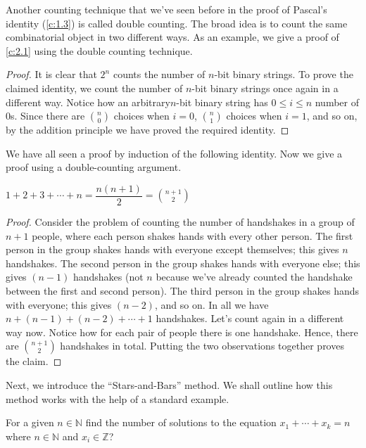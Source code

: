 Another counting technique that we've seen before in the proof of Pascal's identity (\cref{c:1.3}) is called double counting. The broad idea is to count the same combinatorial object in two different ways. As an example, we give a proof of \cref{c:2.1} using the double counting technique.
\begin{proof}
It is clear that $2^n$ counts the number of $n$-bit binary strings. To prove the claimed identity, we count the number of $n$-bit binary strings once again in a different way. Notice how an arbitrary$n$-bit binary string has $0\leq i\leq n$ number of $0$s. Since there are $\binom{n}{0}$ choices when $i=0$, $\binom{n}{1}$ choices when $i=1$, and so on, by the addition principle we have proved the required identity.
\end{proof}
We have all seen a proof by induction of the following identity. Now we give a proof using a double-counting argument.
\begin{claim}
	$1+2+3+\cdots+n=\dfrac{n\left( n+1 \right)}{2}=\binom{n+1}{2}$
	\label{c:2.2}
\end{claim}
\begin{proof}
Consider the problem of counting the number of handshakes in a group of $n+1$ people, where each person shakes hands with every other person. The first person in the group shakes hands with everyone except themselves; this gives $n$ handshakes. The second person in the group shakes hands with everyone else; this gives $\left( n-1 \right)$ handshakes (not $n$ because we've already counted the handshake between the first and second person). The third person in the group shakes hands with everyone; this gives $\left( n-2 \right)$, and so on. In all we have $n+\left( n-1 \right)+\left( n-2 \right)+\cdots+1$ handshakes. Let's count again in a different way now. Notice how for each pair of people there is one handshake. Hence, there are $\binom{n+1}{2}$ handshakes in total. Putting the two observations together proves the claim.
\end{proof}
Next, we introduce the ``Stars-and-Bars'' method. We shall outline how this method works with the help of a standard example.
\begin{question}
For a given $n\in \mathbb{N}$ find the number of solutions to the equation  $x_{1}+\cdots+x_{k}=n$ where $n\in\mathbb{N}$ and  $x_{i}\in\mathbb{Z}$?
\label{q:2.3}
\end{question}
